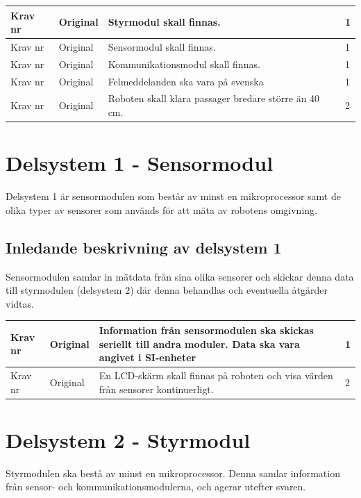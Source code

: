 \documentclass[11pt]{article}
\newcounter{kravc}
\newcommand{\kravcc}{
	\thekravc
	\stepcounter{kravc}
}
\begin{document}
\begin{flushleft}
\begin{center}
\begin{longtable}{|l|l|p{.70\linewidth}|l|}
Krav nr\kravcc &
Original &
Styrmodul skall finnas. &
1 \\ \hline

Krav nr\kravcc &
Original &
Sensormodul skall finnas. &
1 \\ \hline

Krav nr\kravcc &
Original &
Kommunikationsmodul skall finnas. &
1 \\ \hline

Krav nr\kravcc &
Original &
Felmeddelanden ska vara på svenska &
1 \\ \hline

Krav nr\kravcc &
Original &
Roboten skall klara passager bredare större än 40 cm. &
2 \\ \hline
\end{longtable}
\end{center}

\pagebreak

\section{Delsystem 1 - Sensormodul}
Delsystem 1 är sensormodulen som består av minst en mikroprocessor samt de olika typer av sensorer som används för att mäta av robotens omgivning.


\subsection{Inledande beskrivning av delsystem 1}
Sensormodulen samlar in mätdata från sina olika sensorer och skickar denna data till styrmodulen (delsystem 2) där denna behandlas och eventuella åtgärder vidtas.

\begin{center}
\begin{longtable}{|l|l|p{.70\linewidth}|l|} \hline


Krav nr\kravcc & 
Original &
Information från sensormodulen ska skickas seriellt till andra moduler. Data ska vara angivet i SI-enheter &
1 \\ \hline

Krav nr\kravcc &
Original &
En LCD-skärm skall finnas på roboten och visa värden från sensorer kontinuerligt. &
2 \\ \hline

\end{longtable}
\end{center}


\section{Delsystem 2 - Styrmodul}
Styrmodulen ska bestå av minst en mikroprocessor.  Denna samlar information från sensor- och kommunikationsmodulerna, och agerar utefter svaren.



\end{flushleft}
\end{document}
